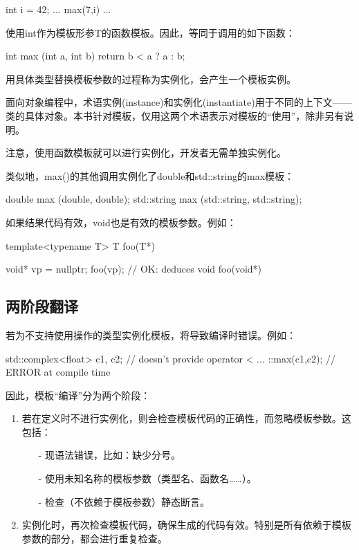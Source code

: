 \begin{cpp}
int i = 42;
... max(7,i) ...
\end{cpp}

使用int作为模板形参T的函数模板。因此，等同于调用的如下函数：

\begin{cpp}
int max (int a, int b)
{
	return b < a ? a : b;
}
\end{cpp}

用具体类型替换模板参数的过程称为实例化，会产生一个模板实例。

\begin{notice}
面向对象编程中，术语实例(instance)和实例化(instantiate)用于不同的上下文——类的具体对象。本书针对模板，仅用这两个术语表示对模板的“使用”，除非另有说明。
\end{notice}

注意，使用函数模板就可以进行实例化，开发者无需单独实例化。

类似地，max()的其他调用实例化了double和std::string的max模板：

\begin{cpp}
double max (double, double);
std::string max (std::string, std::string);
\end{cpp}

如果结果代码有效，void也是有效的模板参数。例如：

\begin{cpp}
template<typename T>
T foo(T*)
{
}

void* vp = nullptr;
foo(vp); // OK: deduces void foo(void*)
\end{cpp}

\subsection{两阶段翻译}

若为不支持使用操作的类型实例化模板，将导致编译时错误。例如：

\begin{cpp}
std::complex<float> c1, c2; // doesn't provide operator <
...
::max(c1,c2); // ERROR at compile time
\end{cpp}

因此，模板“编译”分为两个阶段：

\begin{enumerate}
\item 
若在定义时不进行实例化，则会检查模板代码的正确性，而忽略模板参数。这包括：
\begin{itemize}
\item[-] 
现语法错误，比如：缺少分号。

\item[-]
使用未知名称的模板参数（类型名、函数名……）。

\item[-]
检查（不依赖于模板参数）静态断言。
\end{itemize}

\item 
实例化时，再次检查模板代码，确保生成的代码有效。特别是所有依赖于模板参数的部分，都会进行重复检查。
\end{enumerate}

